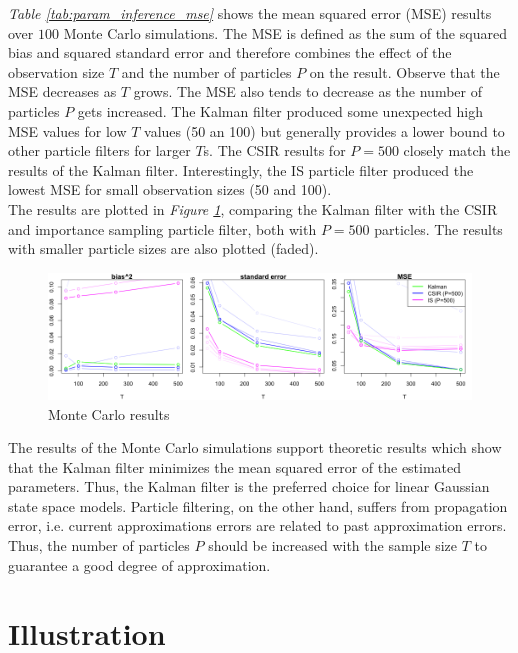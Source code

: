 \documentclass[11pt, oneside]{scrreprt}   	%
\begin{document}
\textit{Table \ref{tab:param_inference_mse}} shows the mean squared error (MSE) results over $100$ Monte Carlo simulations. The MSE is defined as the sum of the squared bias and squared standard error and therefore combines the effect of the observation size $T$ and the number of particles $P$ on the result. Observe that the MSE decreases as $T$ grows. The MSE also tends to decrease as the number of particles $P$ gets increased. The Kalman filter produced some unexpected high MSE values for low $T$ values (50 an 100) but generally provides a lower bound to other particle filters for larger $T$s. The CSIR results for $P=500$ closely match the results of the Kalman filter. Interestingly, the IS particle filter produced the lowest MSE for small observation sizes (50 and 100).\\

The results are plotted in \textit{Figure \ref{fig:ullm-mc-mle}}, comparing the Kalman filter with the CSIR and importance sampling particle filter, both with $P=500$ particles. The results with smaller particle sizes are also plotted (faded).

\begin{figure}[h!]
\centering
\includegraphics[width=155mm]{../../images/ullm-mc-mle.png}
\caption{Monte Carlo results}
\label{fig:ullm-mc-mle}
\end{figure}


The results of the Monte Carlo simulations support theoretic results which show that the Kalman filter minimizes the mean squared error of the estimated parameters. Thus, the Kalman filter is the preferred choice for linear Gaussian state space models. Particle filtering, on the other hand, suffers from propagation error, i.e. current approximations errors are related to past approximation errors. Thus, the number of particles $P$ should be increased with the sample size $T$ to guarantee a good degree of approximation.



\chapter{Illustration}
\label{chp:Illustration}
\end{document}
